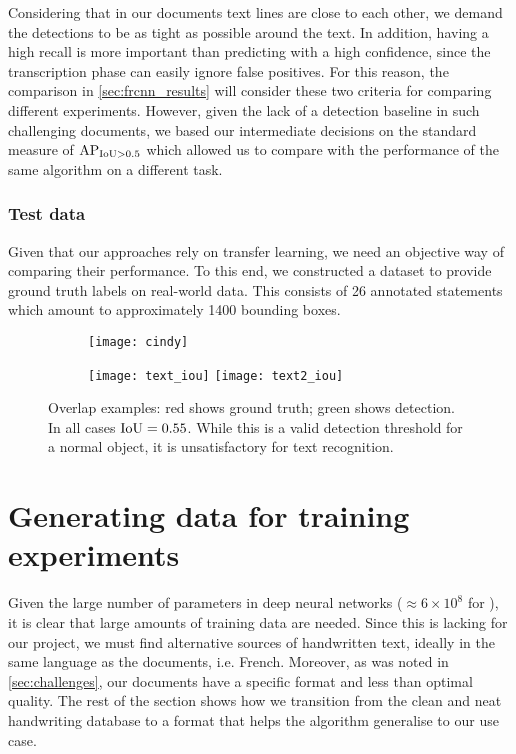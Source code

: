 	Considering that in our documents text lines are close to each other, we demand the detections to be as tight as possible around the text. In addition, having a high recall is more important than predicting with a high confidence, since the transcription phase can easily ignore false positives. For this reason, the comparison in \autoref{sec:frcnn_results} will consider these two criteria for comparing different experiments. However, given the lack of a detection baseline in such challenging documents, we based our intermediate decisions on the standard measure of \(\operatorname{\operatorname{AP}_{\operatorname{IoU} > 0.5}}\) which allowed us to compare with the performance of the same algorithm on a different task.

	\subsubsection*{Test data}\label{sec:detection_test_data}

	Given that our approaches rely on transfer learning, we need an objective way of comparing their performance. To this end, we constructed a  dataset to provide ground truth labels on real-world data. This consists of 26 annotated statements which amount to approximately 1400 bounding boxes.

	\begin{figure}
		\begin{subfigure}[b]{0.49\linewidth}
			\texttt{[image: cindy]}
			\caption{\label{fig:cindy}}
		\end{subfigure}
		\begin{subfigure}[b]{0.49\linewidth}
			\texttt{[image: text\_iou]}
			\vspace{2em} %
			\texttt{[image: text2\_iou]}
			\caption{\label{fig:text_overlap_example}}
		\end{subfigure}
		\caption[Overlap examples]{Overlap examples: red shows ground truth; green shows detection. In all cases \(\operatorname{IoU} = 0.55\). While this is a valid detection threshold for a normal object, it is unsatisfactory for text recognition.
		}
		\label{fig:overlap_example}
	\end{figure}




\section{Generating data for training experiments}\label{sec:detection_experiments}
	Given the large number of parameters in deep neural networks (\(\approx 6 \times 10^8\) for \RESNET{}), it is clear that large amounts of training data are needed. Since this is lacking for our project, we must find alternative sources of handwritten text, ideally in the same language as the documents, i.e. French. Moreover, as was noted in \autoref{sec:challenges}, our documents have a specific format and less than optimal quality. The rest of the section shows how we transition from the clean and neat handwriting database to a format that helps the algorithm generalise to our use case.

